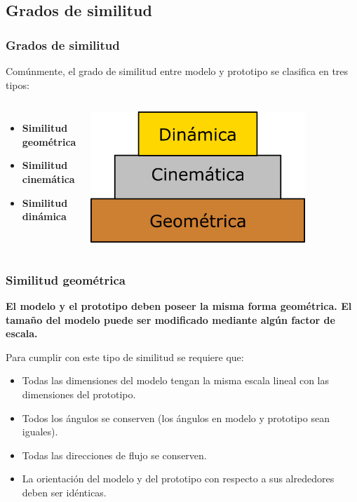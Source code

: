 \documentclass[t]{beamer}
\begin{document}
\subsection{Grados de similitud}
\begin{frame}[c]
\frametitle{Grados de similitud}

Comúnmente, el grado de similitud entre modelo y prototipo se clasifica en tres tipos:
\vspace{0.5cm}

\begin{columns}[c]
\begin{itemize}
\item \textbf{Similitud geométrica}
\item \textbf{Similitud cinemática}
\item \textbf{Similitud dinámica}
\end{itemize}
\includegraphics[width=0.8\textwidth]{Figures/grados_sim.png}
\end{columns}
\end{frame}
\begin{frame}
\frametitle{Similitud geométrica}


    \textbf{El modelo y el prototipo deben poseer la misma forma geométrica. El
tamaño del modelo puede ser modificado mediante algún factor de escala.}

\vspace{0.2cm}

Para cumplir con este tipo de similitud se requiere que:

    \begin{itemize}
\item
  Todas las dimensiones del modelo tengan la misma escala lineal con las
  dimensiones del prototipo. 
\item
  Todos los ángulos se conserven (los ángulos en modelo y prototipo sean
  iguales). 
\item
  Todas las direcciones de flujo se conserven. 
\item
  La orientación del modelo y del prototipo con respecto a sus
  alrededores deben ser idénticas. 
\end{itemize}

\end{frame}
\end{document}
